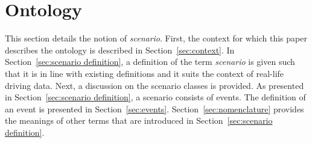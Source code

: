 \section{Ontology}
\label{sec:ontology}

This section details the notion of \emph{scenario}. First, the context for which this paper describes the ontology is described in Section~\ref{sec:context}. In Section~\ref{sec:scenario definition}, a definition of the term \emph{scenario} is given such that it is in line with existing definitions and it suits the context of real-life driving data. Next, a discussion on the scenario classes is provided. As presented in Section~\ref{sec:scenario definition}, a scenario consists of events. The definition of an event is presented in Section~\ref{sec:events}. Section~\ref{sec:nomenclature} provides the meanings of other terms that are introduced in Section~\ref{sec:scenario definition}.






